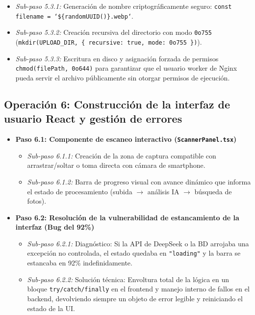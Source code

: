 \documentclass[11pt,a4paper]{article}
\begin{document}
\begin{itemize}
\begin{itemize}
        \item \textit{Sub-paso 5.3.1:} Generación de nombre criptográficamente seguro: \texttt{const filename = `\$\{randomUUID()\}.webp`}.
        \item \textit{Sub-paso 5.3.2:} Creación recursiva del directorio con modo \texttt{0o755} (\texttt{mkdir(UPLOAD\_DIR, \{ recursive: true, mode: 0o755 \})}).
        \item \textit{Sub-paso 5.3.3:} Escritura en disco y asignación forzada de permisos \texttt{chmod(filePath, 0o644)} para garantizar que el usuario worker de Nginx pueda servir el archivo públicamente sin otorgar permisos de ejecución.
    \end{itemize}
\end{itemize}

\subsection{Operación 6: Construcción de la interfaz de usuario React y gestión de errores}
\begin{itemize}
    \item \textbf{Paso 6.1: Componente de escaneo interactivo (\texttt{ScannerPanel.tsx})}
    \begin{itemize}
        \item \textit{Sub-paso 6.1.1:} Creación de la zona de captura compatible con arrastrar/soltar o toma directa con cámara de smartphone.
        \item \textit{Sub-paso 6.1.2:} Barra de progreso visual con avance dinámico que informa el estado de procesamiento (subida $\rightarrow$ análisis IA $\rightarrow$ búsqueda de fotos).
    \end{itemize}
    \item \textbf{Paso 6.2: Resolución de la vulnerabilidad de estancamiento de la interfaz (Bug del 92\%)}
    \begin{itemize}
        \item \textit{Sub-paso 6.2.1:} Diagnóstico: Si la API de DeepSeek o la BD arrojaba una excepción no controlada, el estado quedaba en \texttt{"loading"} y la barra se estancaba en 92\% indefinidamente.
        \item \textit{Sub-paso 6.2.2:} Solución técnica: Envoltura total de la lógica en un bloque \texttt{try/catch/finally} en el frontend y manejo interno de fallos en el backend, devolviendo siempre un objeto de error legible y reiniciando el estado de la UI.
    \end{itemize}
\end{itemize}
\end{document}
